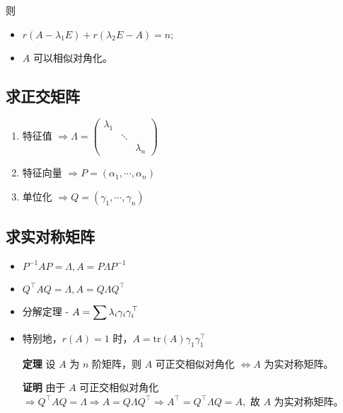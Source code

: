 则\begin{itemize}
    \item $ r(A-\lambda_1E) + r(\lambda_2E-A) = n; $ 
    \item $ A $ 可以相似对角化。
\end{itemize}


\subsection{求正交矩阵}

\begin{enumerate}
    \item 特征值 $ \Rightarrow \Lambda = \begin{pmatrix}
        \lambda_1&&\\&\ddots&\\&&\lambda_n
    \end{pmatrix} $ 
    \item 特征向量 $ \Rightarrow P = (\alpha_1,\cdots,\alpha_n) $ 
    \item 单位化 $ \Rightarrow Q = (\gamma_1,\cdots,\gamma_n) $ 
\end{enumerate}

\subsection{求实对称矩阵}

\begin{itemize}
    \item $ P^{-1}AP = \Lambda, A = P\Lambda P^{-1} $ 
    \item $ Q^\top AQ = \Lambda, A = Q\Lambda Q^\top $ 
    \item 分解定理 - $ A = \displaystyle\sum\lambda_i\gamma_i\gamma_i^\top $ 
    \item 特别地，$ r(A) = 1 $ 时，$ A = \textrm{tr}(A)\gamma_1\gamma_1^\top $ 
\end{itemize}

\begin{enumerate}
    \item[\textbf{定理}] 设 $ A $ 为 $ n $ 阶矩阵，则 $ A $ 可正交相似对角化 $ \Leftrightarrow A $ 为实对称矩阵。
    \item[\textbf{证明}] 
    由于 $ A $ 可正交相似对角化 $  \Rightarrow Q^\top AQ =\Lambda \Rightarrow
    A = Q\Lambda Q^\top \Rightarrow A^\top = Q^\top \Lambda Q = A, $ 
    故 $ A $ 为实对称矩阵。
\end{enumerate}

